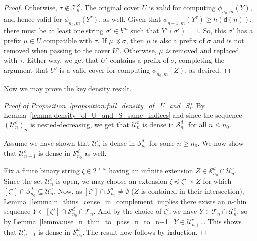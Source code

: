 \begin{proof}
    Otherwise, $\tau \notin \mathcal{T}^Z_n$. The original cover $U$ is valid for computing $\phi_{n_0, m}(Y)$, and hence valid for $\phi_{n_0, m}(Y^\tau)$, as well. Given that $\phi_{n + 1, m}(Y^\tau) \geq h(\mathsf{d}(n))$, there must be at least one string $\sigma' \in b^m$ such that $Y^\tau(\sigma') = 1$. So, this $\sigma'$ has a prefix $\mu \in U$ compatible with $\tau$. If $\mu \preceq \sigma$, then $\mu$ is also a prefix of $\sigma$ and is not removed when passing to the cover $U'$. Otherwise, $\mu$ \textit{is} removed and replaced with $\tau$. Either way, we get that $U'$ contains a prefix of $\sigma$, completing the argument that $U'$ is a valid cover for computing $\phi_{n_0, m}(Z)$, as desired. 
\end{proof}

Now we may prove the key density result.

\begin{proof}[Proof of Proposition~\ref{proposition:full_density_of_U_and_S}]
    By Lemma~\ref{lemma:density_of_U_and_S_same_indices} and since the sequence $(\mathcal{U}^c_n)_n$ is nested-decreasing, we get that $\mathcal{U}^c_n$ is dense in $\mathcal{S}^d_{n_0}$ for all $n \leq n_0$. 

    Assume we have shown that $\mathcal{U}^c_n$ is dense in $\mathcal{S}^d_{n_0}$ for some $n \geq n_0$. We now show that $\mathcal{U}^c_{n + 1}$ is dense in $\mathcal{S}^d_{n_0}$ as well. 

    Fix a finite binary string $\zeta \in 2^{<\omega}$ having an infinite extension $Z \in \mathcal{S}^d_{n_0} \cap \mathcal{U}^c_n$. Since the set $\mathcal{U}^c_n$ is open, we may choose an extension $\zeta \preceq \zeta' \prec Z$ for which $[\zeta'] \cap \mathcal{S}^d_{n_0} \subseteq \mathcal{U}^c_n$. Now, as $[\zeta'] \cap \mathcal{S}^d_{n_0} \neq \emptyset$ ($Z$ is contained in their intersection), Lemma~\ref{lemma:n_thins_dense_in_complement} implies there exists an $n$-thin sequence $Y \in [\zeta'] \cap \mathcal{S}^d_{n_0} \cap \mathcal{T}_n$. And by the choice of $\zeta'$, we have $Y \in \mathcal{T}_n \cap \mathcal{U}^c_n$, so by Lemma~\ref{lemma:use_n_thin_to_pass_n_to_n+1}, $Y \in \mathcal{U}^c_{n + 1}$. This shows that $\mathcal{U}^c_{n + 1}$ is dense in $\mathcal{S}^d_{n_0}$. The result now follows by induction.    
\end{proof}


